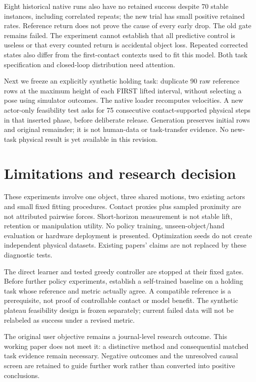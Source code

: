 \documentclass[10pt]{article}
\begin{document}
Eight historical native runs also have no retained success despite 70 stable
instances, including correlated repeats; the new trial has small positive
retained rates. Reference return does not prove the cause of every early drop.
The old gate remains failed. The experiment cannot establish that all predictive
control is useless or that every counted return is accidental object loss.
Repeated corrected states also differ from the first-contact contexts used to
fit this model. Both task specification and closed-loop distribution need attention.

Next we freeze an explicitly synthetic holding task: duplicate 90 raw reference
rows at the maximum height of each FIRST lifted interval, without selecting a
pose using simulator outcomes. The native loader recomputes velocities. A new
actor-only feasibility test asks for 75 consecutive contact-supported physical
steps in that inserted phase, before deliberate release. Generation preserves
initial rows and original remainder; it is not human-data or task-transfer evidence.
No new-task physical result is yet available in this revision.

\section{Limitations and research decision}
These experiments involve one object, three shared motions, two existing actors
and small fixed fitting procedures. Contact proxies plus sampled proximity are
not attributed pairwise forces. Short-horizon measurement is not stable lift,
retention or manipulation utility. No policy training, unseen-object/hand evaluation
or hardware deployment is presented. Optimization seeds do not create independent
physical datasets. Existing papers' claims are not replaced by these diagnostic tests.

The direct learner and tested greedy controller are stopped at their fixed gates.
Before further policy experiments, establish a self-trained baseline on a holding
task whose reference and metric actually agree. A compatible reference is a
prerequisite, not proof of controllable contact or model benefit. The synthetic
plateau feasibility design is frozen separately; current failed data will not
be relabeled as success under a revised metric.

The original user objective remains a journal-level research outcome. This working
paper does not meet it: a distinctive method and consequential matched task evidence
remain necessary. Negative outcomes and the unresolved causal screen are retained
to guide further work rather than converted into positive conclusions.
\end{document}
